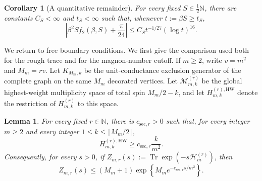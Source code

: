 \documentclass[11pt]{article}
\numberwithin{equation}{section}
\newtheorem{lemma}[theorem]{Lemma}
\newtheorem{corollary}[theorem]{Corollary}
\theoremstyle{remark}
\newcommand{\N}{\mathbb N}
\newcommand{\Tr}{\operatorname{Tr}}
\newcommand{\1}{\mathbf 1}
\begin{document}
\begin{corollary}[A quantitative remainder]
\label{cor:quantitative-free-energy}
For every fixed \(S\in\frac12\N\), there are constants
\(C_S<\infty\) and \(t_S<\infty\) such that, whenever
\(t:=\beta S\geq t_S\),
\begin{equation}
 \left|\beta^2S f_2(\beta,S)+\frac{\pi}{24}\right|
 \leq C_S t^{-1/27}(\log t)^{16}.
 \label{eq:quantitative-free-energy}
\end{equation}
\end{corollary}

We return to free boundary conditions.  We first give the comparison used
both for the rough trace and for the magnon-number cutoff.  If \(m\geq2\),
write \(v=m^2\) and \(M_m=rv\).  Let \(K_{M_m,k}\) be the unit-conductance
exclusion generator of the complete graph on the same \(M_m\) decorated
vertices.
Let \(\mathcal M_{m,k}^{(r)}\) be the global highest-weight multiplicity
space of total spin \(M_m/2-k\), and let
\(H_{m,k}^{(r),\mathrm{HW}}\) denote the restriction of
\(H_{m,k}^{(r)}\) to this space.

\begin{lemma}
\label{lem:decorated-rough-sector}
For every fixed \(r\in\mathbb N\), there is \(c_{\mathrm{sec},r}>0\) such
that, for every integer \(m\geq2\) and every integer
\(1\leq k\leq\lfloor M_m/2\rfloor\),
\begin{equation}
 H_{m,k}^{(r),\mathrm{HW}}
 \geq c_{\mathrm{sec},r}\frac{k}{m^2}.
 \label{eq:decorated-rough-sector}
\end{equation}
Consequently, for every \(s>0\), if
\(Z_{m,r}(s):=\Tr\exp(-s\mathcal H_m^{(r)})\), then
\begin{equation}
 Z_{m,r}(s)
 \leq(M_m+1)\exp\left\{M_m
 e^{-c_{\mathrm{sec},r}s/m^2}\right\}.
 \label{eq:decorated-rough-trace}
\end{equation}
\end{lemma}
\end{document}
